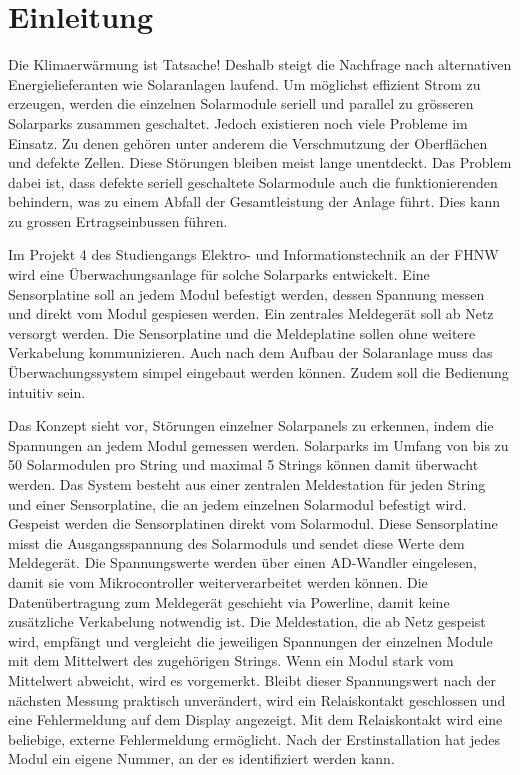 \section{Einleitung}


Die Klimaerwärmung ist Tatsache! Deshalb steigt die Nachfrage nach alternativen Energielieferanten wie Solaranlagen laufend. Um möglichst effizient Strom zu erzeugen, werden die einzelnen Solarmodule seriell und parallel zu grösseren Solarparks zusammen geschaltet. Jedoch existieren noch viele Probleme im Einsatz. Zu denen gehören unter anderem die Verschmutzung der Oberflächen und defekte Zellen. Diese Störungen bleiben meist lange unentdeckt. Das Problem dabei ist, dass defekte seriell geschaltete Solarmodule auch die funktionierenden behindern, was zu einem Abfall der Gesamtleistung der Anlage führt. Dies kann zu grossen Ertragseinbussen führen.


Im Projekt 4 des Studiengangs Elektro- und Informationstechnik an der FHNW wird eine Überwachungsanlage für solche Solarparks entwickelt. Eine Sensorplatine soll an jedem Modul befestigt werden, dessen Spannung messen und direkt vom Modul gespiesen werden. Ein zentrales Meldegerät soll ab Netz versorgt werden. Die Sensorplatine und die Meldeplatine sollen ohne weitere Verkabelung kommunizieren. Auch nach dem Aufbau der Solaranlage muss das Überwachungssystem simpel eingebaut werden können. Zudem soll die Bedienung intuitiv sein.

Das Konzept sieht vor, Störungen einzelner Solarpanels zu erkennen, indem die Spannungen an jedem Modul gemessen werden. Solarparks im Umfang von bis zu 50 Solarmodulen pro String und maximal 5 Strings können damit überwacht werden. Das System besteht aus einer zentralen Meldestation für jeden String und einer Sensorplatine, die an jedem einzelnen Solarmodul befestigt wird. Gespeist werden die Sensorplatinen direkt vom Solarmodul. Diese Sensorplatine misst die Ausgangsspannung des Solarmoduls und sendet diese Werte dem Meldegerät. Die Spannungswerte werden über einen AD-Wandler eingelesen, damit sie vom Mikrocontroller weiterverarbeitet werden können. Die Datenübertragung zum Meldegerät geschieht via Powerline, damit keine zusätzliche Verkabelung notwendig ist. Die Meldestation, die ab Netz gespeist wird, empfängt und vergleicht die jeweiligen Spannungen der einzelnen Module mit dem Mittelwert des zugehörigen Strings. Wenn ein Modul stark vom Mittelwert abweicht, wird es vorgemerkt. Bleibt dieser Spannungswert nach der nächsten Messung praktisch unverändert, wird ein Relaiskontakt geschlossen und eine Fehlermeldung auf dem Display angezeigt. Mit dem Relaiskontakt wird eine beliebige, externe Fehlermeldung ermöglicht. Nach der Erstinstallation hat jedes Modul ein eigene Nummer, an der es identifiziert werden kann.

